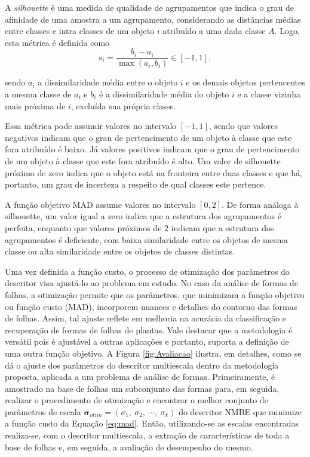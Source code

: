 A \textit{silhouette }\cite{Rousseeuw:1987} é uma medida de qualidade de agrupamentos que indica o grau de afinidade de uma amostra  a um agrupamento, considerando as distâncias médias entre classes e intra classes de um objeto $i$ atribuído a uma dada classe $A$. Logo, esta métrica é definida como 
\begin{equation}
s_i = \frac{b_i - a_i}{\max{(a_i,b_i)}} \in [-1,1],
\end{equation}

\noindent sendo $a_i$ a dissimilaridade média entre o objeto $i$ e os demais objetos pertencentes a mesma classe de $a_i$ e $b_i$ é a dissimilaridade média do objeto $i$ e a classe vizinha mais próxima de $i$, excluída sua própria classe. 

Essa métrica pode assumir valores no intervalo $[-1,1]$, sendo que valores negativos indicam que o grau de pertencimento de um objeto à classe que este fora atribuído é baixo. Já valores positivos indicam que o grau de pertencimento de um objeto à classe que este fora atribuído é alto. Um valor de silhouette próximo de zero indica que o objeto está na fronteira entre duas classes e que há, portanto, um grau de incerteza a respeito de qual classes este pertence.

A função objetivo \ac{MAD} assume valores no intervalo $[0,2]$. De forma análoga à silhouette, um valor igual a zero indica que a estrutura dos agrupamentos é perfeita, enquanto que valores próximos de $2$ indicam que a estrutura dos agrupamentos é deficiente, com baixa similaridade entre os objetos de mesma classe ou alta similaridade entre os objetos de classes distintas.

Uma vez definida a função custo, o processo de otimização dos parâmetros do descritor visa ajustá-lo ao problema em estudo. No caso da análise de formas de folhas, a otimização permite que os parâmetros, que minimizam a função objetivo ou função custo (\ac{MAD}), incorporem nuances e detalhes do contorno das formas de folhas. Assim, tal ajuste reflete em melhoria na acurácia da classificação e recuperação de formas de folhas de plantas. Vale destacar que a metodologia é versátil pois é ajustável a outras aplicações e portanto, suporta a definição de uma outra função objetivo. A Figura  \ref{fig:Avaliacao} ilustra, em detalhes, como se dá o ajuste dos parâmetros do descritor multiescala dentro da metodologia proposta, aplicada a um problema de análise de formas. Primeiramente, é amostrado na base de folhas um subconjunto das formas para, em seguida, realizar o procedimento de otimização e encontrar o melhor conjunto de parâmetros de escala  $\boldsymbol{\sigma}_{otim} = (\sigma_1,\:\sigma_2,\:\cdots,\:\sigma_k)$ do descritor \ac{NMBE} que minimize a função custo da Equação \ref{eq:mad}. Então, utilizando-se as escalas encontradas realiza-se, com o descritor multiescala, a extração de características de toda a base de folhas e, em seguida, a avaliação de desempenho do mesmo.

